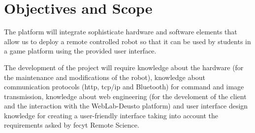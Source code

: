 \chapter{Objectives and Scope}

The platform will integrate sophisticate hardware and software elements that allow us to deploy a
remote controlled robot so that it can be used by students in a game platform using the provided
user interface.

The development of the project will require knowledge about the hardware (for the maintenance and
modifications of the robot), knowledge about communication protocols (\acrshort{http},
\acrshort{tcp}/\acrshort{ip} and Bluetooth) for command and image transmission, knowledge about web
engineering (for the develoment of the client and the interaction with the WebLab-Deusto platform)
and user interface design knowledge for creating a user-friendly interface taking into account the
requirements asked by \acrshort{fecyt} Remote Science.

